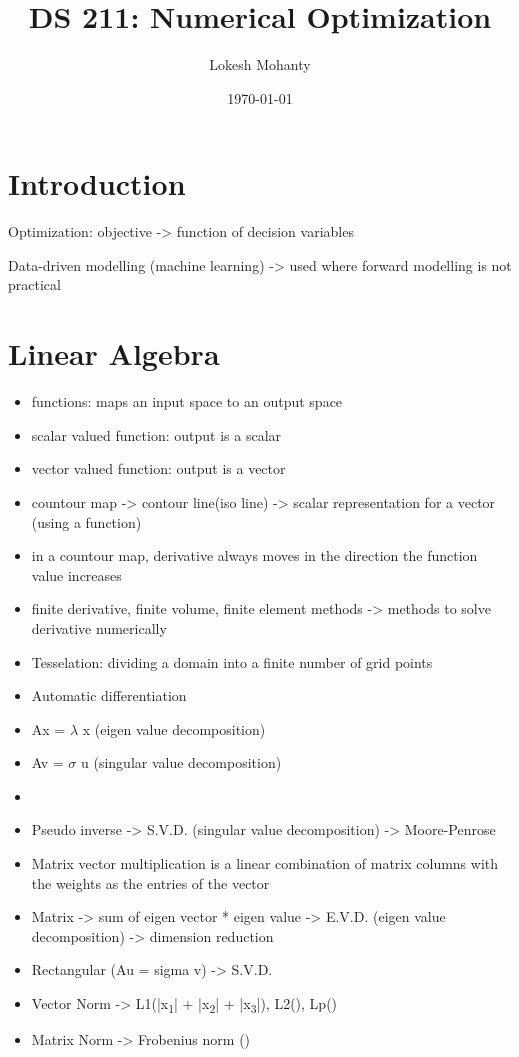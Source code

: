 \documentclass[11pt]{article}
\author{Lokesh Mohanty}
\date{\today}
\title{DS 211: Numerical Optimization}
\begin{document}
\maketitle
\tableofcontents


\section{Introduction}
\label{sec:org280abc1}
Optimization:
objective -> function of decision variables

Data-driven modelling (machine learning) -> used where forward modelling is not practical

\section{Linear Algebra}
\label{sec:orge6fb0e5}
\begin{itemize}
\item functions: maps an input space to an output space
\item scalar valued function: output is a scalar
\item vector valued function: output is a vector
\item countour map -> contour line(iso line) -> scalar representation for a vector (using a function)
\item in a countour map, derivative always moves in the direction the function value increases
\item finite derivative, finite volume, finite element methods -> methods to solve derivative numerically
\item Tesselation: dividing a domain into a finite number of grid points
\item Automatic differentiation
\item Ax = \(\lambda\) x (eigen value decomposition)
\item Av = \(\sigma\) u (singular value decomposition)
\item 

\item Pseudo inverse -> S.V.D. (singular value decomposition) -> Moore-Penrose
\item Matrix vector multiplication is a linear combination of matrix columns with the weights as the entries of the vector
\item Matrix -> sum of eigen vector * eigen value -> E.V.D. (eigen value decomposition) -> dimension reduction
\item Rectangular (Au = sigma v) -> S.V.D.
\item Vector Norm -> L1(|x\textsubscript{1}| + |x\textsubscript{2}| + |x\textsubscript{3}|), L2(), Lp()
\item Matrix Norm -> Frobenius norm ()
\end{itemize}
\end{document}
